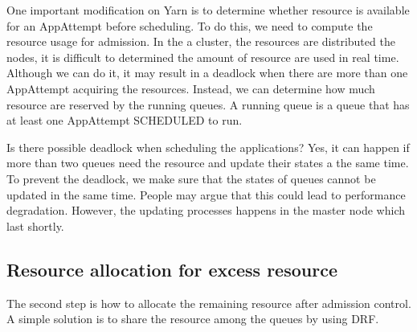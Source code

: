 One important modification on Yarn is to determine whether resource is available for an AppAttempt before scheduling. To do this, we need to compute the resource usage for admission. In the a cluster, the resources are distributed the nodes, it is difficult to determined the amount of resource are used in real time. Although we can do it, it may result in  a deadlock when there are more than one AppAttempt acquiring the resources. Instead, we can determine how much resource are reserved by the running queues. A running queue is a queue that has at least one AppAttempt SCHEDULED to run. 

Is there possible deadlock when scheduling the applications? Yes, it can happen if more than two queues need the resource and update their states a the same time. To prevent the deadlock, we make sure that the states of queues cannot be updated in the same time. People may argue that this could lead to performance degradation. However, the updating processes happens in the master node which last shortly.

\subsection*{Resource allocation for excess resource}

The second step is how to allocate the remaining resource after admission control. A simple solution is to share the resource among the queues by using DRF.